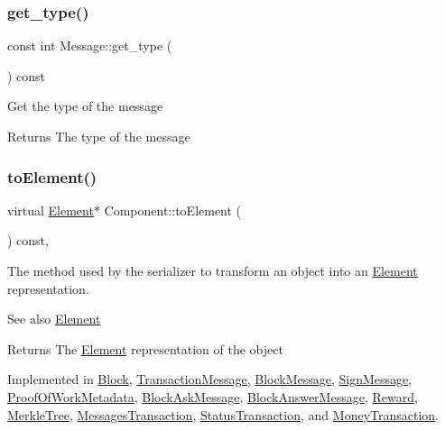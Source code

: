 \subsubsection{\texorpdfstring{get\+\_\+type()}{get\_type()}}
{\footnotesize\ttfamily const int Message\+::get\+\_\+type (\begin{DoxyParamCaption}{ }\end{DoxyParamCaption}) const}

Get the type of the message

\begin{DoxyReturn}{Returns}
The type of the message 
\end{DoxyReturn}
\mbox{\label{classComponent_a3e63d8c993e417a4af3f56d65ebfc7ea}} 
\subsubsection{\texorpdfstring{to\+Element()}{toElement()}}
{\footnotesize\ttfamily virtual \mbox{\hyperlink{classElement}{Element}}$\ast$ Component\+::to\+Element (\begin{DoxyParamCaption}{ }\end{DoxyParamCaption}) const\hspace{0.3cm}{\ttfamily [pure virtual]}, {\ttfamily [inherited]}}

The method used by the serializer to transform an object into an \mbox{\hyperlink{classElement}{Element}} representation. \begin{DoxySeeAlso}{See also}
\mbox{\hyperlink{classElement}{Element}}
\end{DoxySeeAlso}
\begin{DoxyReturn}{Returns}
The \mbox{\hyperlink{classElement}{Element}} representation of the object 
\end{DoxyReturn}


Implemented in \mbox{\hyperlink{classBlock_aa289363a40f0d3ba88720ad0bc71f34f}{Block}}, \mbox{\hyperlink{classTransactionMessage_ae20e7d6a7b5811bb56a32ec6af59b8e2}{Transaction\+Message}}, \mbox{\hyperlink{classBlockMessage_ab47afd5cfb7d6d5c544d8def5d0f9737}{Block\+Message}}, \mbox{\hyperlink{classSignMessage_aee897c4bf78df966b8cca95e589566e4}{Sign\+Message}}, \mbox{\hyperlink{classProofOfWorkMetadata_a2aab4c26afb3a85a712cc065028274d9}{Proof\+Of\+Work\+Metadata}}, \mbox{\hyperlink{classBlockAskMessage_a0bc20076f19423855ab5772003fb65f6}{Block\+Ask\+Message}}, \mbox{\hyperlink{classBlockAnswerMessage_ac7f35ec9f7f2fbcd726628c2a984518b}{Block\+Answer\+Message}}, \mbox{\hyperlink{classReward_a0ecd536148463880f9980fe415b6eb1d}{Reward}}, \mbox{\hyperlink{classMerkleTree_a4e72819c6cbc49ed8ce092f464711a5f}{Merkle\+Tree}}, \mbox{\hyperlink{classMessagesTransaction_a0ef8ec080a2698a02ad8b1b95d243720}{Messages\+Transaction}}, \mbox{\hyperlink{classStatusTransaction_aed42f2d61f2d50ec07bb6b35473f61f2}{Status\+Transaction}}, and \mbox{\hyperlink{classMoneyTransaction_a84adc847266467965014cb04acd48bea}{Money\+Transaction}}.



